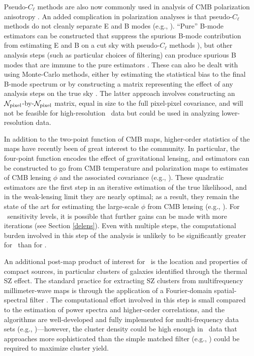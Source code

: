 Pseudo-$C_\ell$ methods are also now commonly used in analysis of CMB polarization anisotropy
\cite{Aghanim:2015xee,Naess:2014wtr,Crites:2014prc}. An added complication in polarization analyses is that 
pseudo-$C_\ell$ methods do not cleanly separate E and B modes (e.g., \cite{Challinor:2005jy}).
``Pure'' B-mode estimators can be constructed that suppress the spurious B-mode contribution
from estimating E and B on a cut sky with pseudo-$C_\ell$ methods \cite{Smith:2005gi}), but 
other analysis steps (such as particular choices of filtering) can produce spurious B modes that
are immune to the pure estimators \cite{Keisler:2015hfa}. These can also be dealt with using Monte-Carlo
methods, either by estimating the statistical bias to the final B-mode spectrum or by constructing
a matrix representing the effect of any analysis steps on the true sky \cite{Ade:2014xna}. The latter
approach involves constructing an ${\cal N}_\mathrm{pixel}$-by-${\cal N}_\mathrm{pixel}$ matrix, equal in size to the 
full pixel-pixel covariance, and will not be feasible for high-resolution \cmbexp\ data but could be 
used in analyzing lower-resolution data.

In addition to the two-point function of CMB maps, higher-order statistics of the maps have recently 
been of great interest to the community. In particular, the four-point function encodes the effect of 
gravitational lensing, and estimators can be constructed to go from CMB temperature and polarization
maps to estimates of CMB lensing $\phi$ and the associated covariance (e.g., \cite{Hu:2001kj,Okamoto:2003zw}).
These quadratic estimators are the first step in an iterative estimation of the true likelihood, and in
the weak-lensing limit they are nearly optimal; as a result, they remain the state of the art for estimating
the large-scale $\phi$ from CMB lensing (e.g., \cite{Ade:2013lta}). For \cmbexp\ sensitivity levels, 
it is possible that further gains can be made with more iterations (see Section \ref{delens}).
Even with multiple steps, the computational burden involved
in this step of the analysis is unlikely to be significantly greater for \cmbexp\ than for \planck.

An additional post-map product of interest for \cmbexp\ is the location and properties of compact
sources, in particular clusters of galaxies identified through the thermal SZ effect. The standard 
practice for extracting SZ clusters from multifrequency millimeter-wave maps is through the application
of a Fourier-domain spatial-spectral filter \cite{Melin:2006qq}.
The computational effort involved in this step is small compared to the estimation of power spectra 
and higher-order correlations, and the algorithms are well-developed and fully implemented for 
multi-frequency data sets (e.g., \cite{Ade:2013skr,Bleem:2014iim})---however, the cluster density
could be high enough in \cmbexp\ data that approaches more sophisticated than the simple matched
filter (e.g., \cite{Pierpaoli:2004bp}) could be required to maximize cluster yield.

